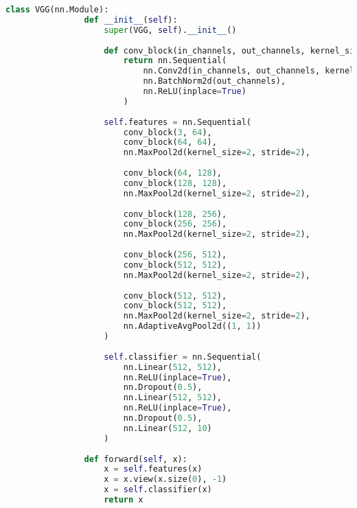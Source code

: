             \begin{lstlisting}[caption={VGG Model Definition}, language=Python]
            class VGG(nn.Module):
                def __init__(self):
                    super(VGG, self).__init__()
                    
                    def conv_block(in_channels, out_channels, kernel_size=3, padding=1):
                        return nn.Sequential(
                            nn.Conv2d(in_channels, out_channels, kernel_size, padding=padding),
                            nn.BatchNorm2d(out_channels),
                            nn.ReLU(inplace=True)
                        )
                    
                    self.features = nn.Sequential(
                        conv_block(3, 64),
                        conv_block(64, 64),
                        nn.MaxPool2d(kernel_size=2, stride=2),
                        
                        conv_block(64, 128),
                        conv_block(128, 128),
                        nn.MaxPool2d(kernel_size=2, stride=2),
                        
                        conv_block(128, 256),
                        conv_block(256, 256),
                        nn.MaxPool2d(kernel_size=2, stride=2),
                        
                        conv_block(256, 512),
                        conv_block(512, 512),
                        nn.MaxPool2d(kernel_size=2, stride=2),
                        
                        conv_block(512, 512),
                        conv_block(512, 512),
                        nn.MaxPool2d(kernel_size=2, stride=2),
                        nn.AdaptiveAvgPool2d((1, 1))
                    )
                    
                    self.classifier = nn.Sequential(
                        nn.Linear(512, 512),
                        nn.ReLU(inplace=True),
                        nn.Dropout(0.5),
                        nn.Linear(512, 512),
                        nn.ReLU(inplace=True),
                        nn.Dropout(0.5),
                        nn.Linear(512, 10)
                    )
            
                def forward(self, x):
                    x = self.features(x)
                    x = x.view(x.size(0), -1)
                    x = self.classifier(x)
                    return x
            \end{lstlisting}
        
